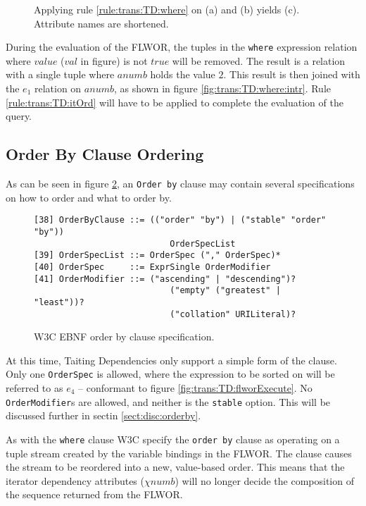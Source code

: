 \begin{myExample}
\begin{figure}[h]
\caption[Example: Evaluation of where clause]{Applying rule \ref{rule:trans:TD:where} on (a) and (b)
yields (c). Attribute names are shortened. \label{fig:trans:TD:whereClause}}
\end{figure}

During the evaluation of the FLWOR, the tuples in the \texttt{where} expression relation where $value$ ($val$ in
figure) is not $true$ will be removed. The result is a relation with a single tuple where $anumb$ holds the value
$2$. This result is then joined with the $e_1$ relation on $anumb$, as shown in figure
\ref{fig:trans:TD:where:intr}. Rule \ref{rule:trans:TD:itOrd} will have to be applied to complete the
evaluation of the query.
\end{myExample}


\subsection{Order By Clause Ordering}

As can be seen in figure \ref{fig:trans:TD:ordEBNF}, an \texttt{Order by} clause may contain several specifications on
how to order and what to order by.
\begin{figure}[h]
\begin{Verbatim}
[38] OrderByClause ::= (("order" "by") | ("stable" "order" "by")) 
                           OrderSpecList
[39] OrderSpecList ::= OrderSpec ("," OrderSpec)*
[40] OrderSpec     ::= ExprSingle OrderModifier
[41] OrderModifier ::= ("ascending" | "descending")? 
                           ("empty" ("greatest" | "least"))? 
                           ("collation" URILiteral)?
\end{Verbatim}
\label{fig:trans:TD:ordEBNF}
\caption[W3C EBNF order by clause specification]{W3C EBNF order by clause specification\cite{w3c00}.}
\end{figure}

At this time, Taiting Dependencies only support a simple form of the clause. Only one \texttt{OrderSpec} is
allowed, where the expression to be sorted on will be referred to as $e_4$ -- conformant to figure
\ref{fig:trans:TD:flworExecute}. No \texttt{OrderModifier}s are allowed, and neither is the \texttt{stable}
option. This will be discussed further in sectin \ref{sect:disc:orderby}.

As with the \texttt{where} clause W3C specify the \texttt{order by} clause as operating on a tuple stream created
by the variable bindings in the FLWOR\cite{w3c00}. The clause causes the stream to be reordered into a new,
value-based order. This means that the iterator dependency attributes ($\chi{numb}$) will no longer decide the
composition of the sequence returned from the FLWOR.

